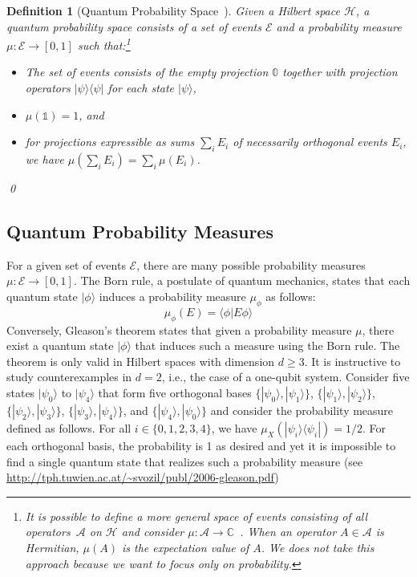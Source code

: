 \documentclass{article}
\theoremstyle{indented}
\newtheorem{definition}{Definition}
\newcommand{\events}{\ensuremath{\mathcal{E}}}
\newcommand{\Hilb}{\mathcal{H}}
\newcommand{\ket}[1]{|#1\rangle}
\newcommand{\ip}[2]{\langle #1 | #2 \rangle}
\newcommand{\proj}[1]{|#1 \rangle\langle #1 |}
\newcommand{\yutsung}[1]{\fbox{\begin{minipage}{0.9\textwidth}\color{purple}{Yu-Tsung says: #1}\end{minipage}}}
\def\C{{\mathbb{C}}}
\begin{document}
\begin{definition}[Quantum Probability Space~\cite{BirkhoffVonNeumann1936,gleason1957,Redhead1987-REDINA,DBLP:journals/corr/abs-0910-2393,Maassen2010}]
  Given a Hilbert space $\Hilb$, a \emph{quantum probability space}
  consists of a set of events $\events$ and a probability measure
  $\mu : \events \rightarrow [0,1]$ such that:\footnote {It is
    possible to define a more general space of events consisting of
    all operators~$\mathcal{A}$ on $\Hilb$ and consider
    $\mu:\mathcal{A}\rightarrow\C$~\cite{Maassen2010,Swart2013}.  When
    an operator $A\in\mathcal{A}$ is Hermitian, $\mu\left(A\right)$ is
    the expectation value of $A$. We does not take this approach
    because we want to focus only on probability. }
\begin{itemize}
\item The set of events consists of the empty projection $\mathbb{0}$
  together with projection operators $\proj{\psi}$ for each state
  $\ket{\psi}$,\\
  \yutsung{and the sum of the orthogonal events recursively.}
\item $\mu(\mathbb{1})=1$, and 
\item for projections expressible as sums $\sum_{i}E_{i}$ of
  necessarily orthogonal events $E_i$, we have
  $\mu\left(\sum_{i}E_{i}\right)=\sum_{i}\mu\left(E_{i}\right)$.
\end{itemize}
\qed\end{definition}

\subsection{Quantum Probability Measures}

For a given set of events $\events$, there are many possible
probability measures $\mu : \events \rightarrow [0,1]$. The Born rule,
a postulate of quantum mechanics, states that each quantum state
$\ket{\phi}$ induces a probability measure $\mu_\phi$ as follows:
\[ 
\mu_\phi(E) = \ip{\phi}{E\phi}
\]
Conversely, Gleason's theorem states that given a probability measure
$\mu$, there exist a quantum state $\ket{\phi}$ that induces such a
measure using the Born rule. The theorem is only valid in Hilbert
spaces with dimension $d \geq 3$. It is instructive to study
counterexamples in $d=2$, i.e., the case of a one-qubit
system. Consider five states $\ket{\psi_0}$ to $\ket{\psi_4}$ that
form five orthogonal bases $\{ \ket{\psi_0}, \ket{\psi_1} \}$,
$\{ \ket{\psi_1}, \ket{\psi_2} \}$,
$\{ \ket{\psi_2}, \ket{\psi_3} \}$,
$\{ \ket{\psi_3}, \ket{\psi_4} \}$, and
$\{ \ket{\psi_4}, \ket{\psi_0} \}$ and consider the probability
measure defined as follows. For all $i \in \{0,1,2,3,4\}$, we have
$\mu_X(\proj{\psi_i}) = 1/2$. For each orthogonal basis, the
probability is 1 as desired and yet it is impossible to find a single
quantum state that realizes such a probability
measure (see \url{http://tph.tuwien.ac.at/~svozil/publ/2006-gleason.pdf})
\end{document}
